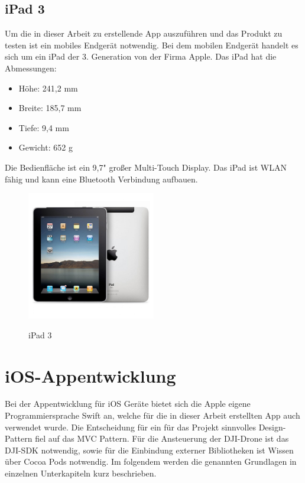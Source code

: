 \subsection{iPad 3}
Um die in dieser Arbeit zu erstellende App auszuführen und das Produkt zu testen ist ein mobiles Endgerät notwendig. 
\newline
Bei dem mobilen Endgerät handelt es sich um ein iPad der 3. Generation von der Firma Apple.
\newline 
Das iPad hat die Abmessungen:
\begin{itemize}
	\item Höhe: 241,2 mm
	\item Breite: 185,7 mm
	\item Tiefe: 9,4 mm
	\item Gewicht: 652 g
\end{itemize}
Die Bedienfläche ist ein 9,7" großer Multi-Touch Display. Das iPad ist \acl{WLAN} fähig und kann eine Bluetooth Verbindung aufbauen.
\begin{figure}[H]
	\begin{center}
		{\includegraphics[width=0.5\textwidth]{images/iPad3.jpg}}
		\caption{iPad 3}
	\end{center}
\end{figure}


\section{iOS-Appentwicklung}\label{sec:ioS-Appentwicklung}
Bei der Appentwicklung für iOS Geräte bietet sich die Apple eigene Programmiersprache Swift an, welche für die in dieser Arbeit erstellten App auch verwendet wurde. 
\newline
Die Entscheidung für ein für das Projekt sinnvolles Design-Pattern fiel auf das \acf{MVC} Pattern.
\newline
Für die Ansteuerung der DJI-Drone ist das DJI-SDK notwendig, sowie für die Einbindung externer Bibliotheken ist Wissen über Cocoa Pods notwendig.
\newline
Im folgendem werden die genannten Grundlagen in einzelnen Unterkapiteln kurz beschrieben.

